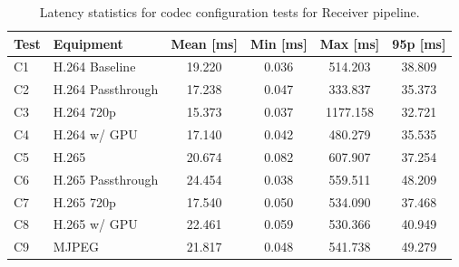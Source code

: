 \begin{table}[H]
    \centering
    \caption{Latency statistics for codec configuration tests for Receiver pipeline.}\label{tab:rec_codec_latency}
    \begin{tabular}{|l|l|c|c|c|c|}
    \hline
    \textbf{Test} & \textbf{Equipment} & \textbf{Mean [ms]} & \textbf{Min [ms]} & \textbf{Max [ms]} & \textbf{95p [ms]} \\
    \hline
    C1 & H.264 Baseline & 19.220 & 0.036 & 514.203 & 38.809\\
    \hline
    C2 & H.264 Passthrough & 17.238 & 0.047 & 333.837 & 35.373  \\
    \hline
    C3 & H.264 720p & 15.373 & 0.037 & 1177.158 & 32.721 \\
    \hline
    C4 & H.264 w/ GPU & 17.140 & 0.042 & 480.279 & 35.535  \\
    \hline
    C5 & H.265 & 20.674 & 0.082 & 607.907 & 37.254\\
    \hline
    C6 & H.265 Passthrough & 24.454 & 0.038 & 559.511 & 48.209 \\
    \hline
    C7 & H.265 720p & 17.540 & 0.050 & 534.090 & 37.468 \\
    \hline
    C8 & H.265 w/ GPU & 22.461 & 0.059 & 530.366 & 40.949 \\
    \hline
    C9 & MJPEG & 21.817 & 0.048 & 541.738 & 49.279  \\
    \hline
    \end{tabular}
\end{table}

